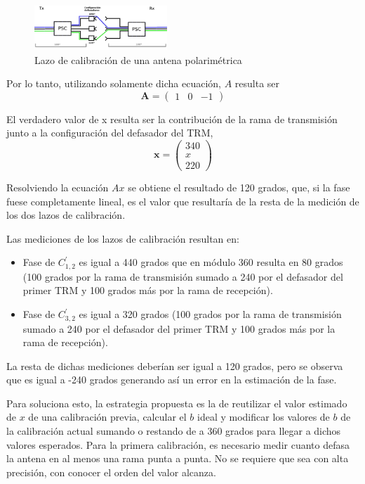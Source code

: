 \begin{figure}[H]
 \centering
 \includegraphics[width=5cm]{gfx/loopCal.png}
 \caption{Lazo de calibración de una antena polarimétrica}
 \label{fig:phaseDetermination}
\end{figure}

Por lo tanto, utilizando solamente dicha ecuación, $A$ resulta ser
$$
	\mathbf{A} = \begin{pmatrix} 1 & 0 & -1\end{pmatrix}
$$

El verdadero valor de x resulta ser la contribución de la rama de transmisión junto a la configuración del defasador del TRM,
$$
	\mathbf{x} = \begin{pmatrix} 340 \\ x \\ 220\end{pmatrix}
$$

Resolviendo la ecuación $Ax$ se obtiene el resultado de 120 grados, que, si la fase fuese completamente lineal, es el valor
que resultaría de la resta de la medición de los dos lazos de calibración.

Las mediciones de los lazos de calibración resultan en:
\begin{itemize}
	\item Fase de $C^{'}_{1,2}$ es igual a 440 grados que en módulo 360 resulta en 80 grados (100 grados por la rama de
		transmisión sumado a 240 por el defasador del primer TRM y 100 grados más por la rama de recepción).
	\item Fase de $C^{'}_{3, 2}$ es igual a 320 grados (100 grados por la rama de transmisión sumado a 240 por el defasador
		del primer TRM y 100 grados más por la rama de recepción).
\end{itemize}

La resta de dichas mediciones deberían ser igual a 120 grados, pero se observa que es igual a -240 grados generando así un
error en la estimación de la fase.

Para soluciona esto, la estrategia propuesta es la de reutilizar el valor estimado de $x$ de una calibración previa, calcular
el $b$ ideal y modificar los valores de $b$ de la calibración actual sumando o restando de a 360 grados para llegar a dichos
valores esperados. Para la primera calibración, es necesario medir cuanto defasa la antena en al menos una rama punta a punta.
No se requiere que sea con alta precisión, con conocer el orden del valor alcanza.

